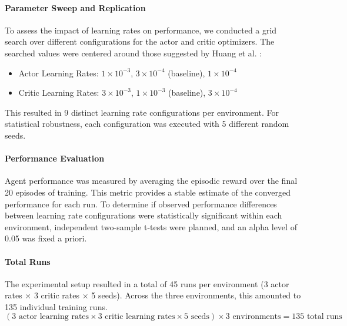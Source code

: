 \documentclass{article}
\begin{document}
\paragraph{Parameter Sweep and Replication}
To assess the impact of learning rates on performance, we conducted a grid search over different configurations for the actor and critic optimizers. The searched values were centered around those suggested by Huang et al. \cite{shengyi2022the37implementation}:
\begin{itemize}
    \item Actor Learning Rates: \(1 \times 10^{-3}\), \textbf{\(3 \times 10^{-4}\)} (baseline), \(1 \times 10^{-4}\)
    \item Critic Learning Rates: \(3 \times 10^{-3}\), \textbf{\(1 \times 10^{-3}\)} (baseline), \(3 \times 10^{-4}\)
\end{itemize}
This resulted in 9 distinct learning rate configurations per environment. For statistical robustness, each configuration was executed with 5 different random seeds.

\paragraph{Performance Evaluation}
Agent performance was measured by averaging the episodic reward over the final 20 episodes of training. This metric provides a stable estimate of the converged performance for each run. To determine if observed performance differences between learning rate configurations were statistically significant within each environment, independent two-sample t-tests were planned, and an alpha level of 0.05 was fixed a priori.

\paragraph{Total Runs}
The experimental setup resulted in a total of 45 runs per environment (3 actor rates \(\times\) 3 critic rates \(\times\) 5 seeds). Across the three environments, this amounted to 135 individual training runs.
\[
(3 \text{ actor learning rates} \times 3 \text{ critic learning rates} \times 5 \text{ seeds}) \times 3 \text{ environments} = 135 \text{ total runs}
\]
\end{document}
